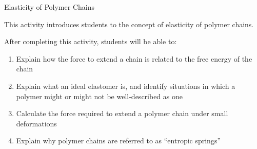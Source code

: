 %
%
%
%

\renewcommand{\figpath}{content/polymphys/chain-confs/chain-elasticity/figs}
\renewcommand{\labelbase}{chain-elasticity}

\begin{activity}{Elasticity of Polymer Chains}

\begin{instructornotes}

	This activity introduces students to the concept of elasticity of polymer chains.
	
	After completing this activity, students will be able to:
			\begin{enumerate}
				\item Explain how the force to extend a chain is related to the free energy of the chain
				\item Explain what an ideal elastomer is, and identify situations in which a polymer might or might not be well-described as one
				\item Calculate the force required to extend a polymer chain under small deformations
				\item Explain why polymer chains are referred to as ``entropic springs''
			\end{enumerate}
	
			

\end{instructornotes}
\end{activity}
